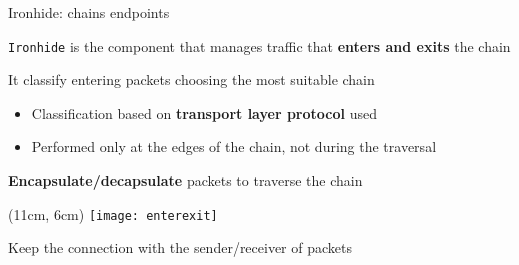 \begin{frame}{Ironhide: chains endpoints}

  \texttt{Ironhide} is the component that manages traffic that \textbf{enters
  and exits} the chain

  \vfill{}

  It classify entering packets choosing the most suitable chain
  \begin{itemize}
    \item Classification based on \textbf{transport layer protocol} used
    \item Performed only at the edges of the chain, not during the traversal
  \end{itemize}

  \vfill{}

  \textbf{Encapsulate/decapsulate} packets to traverse the chain

  \begin{textblock*}{1cm}(11cm, 6cm)
    \texttt{[image: enterexit]}
  \end{textblock*}

  \vfill{}

  Keep the connection with the sender/receiver of packets

\end{frame}